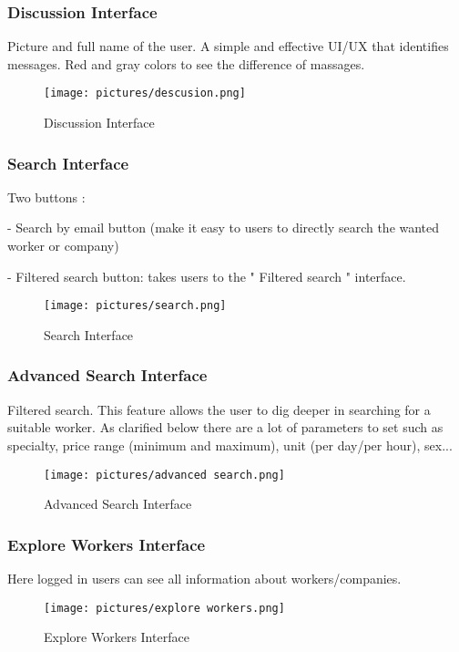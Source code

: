 \documentclass[12pt]{report}
\begin{document}
\subsubsection{Discussion Interface}
Picture and full name of the user.
A simple and effective UI/UX  that identifies  messages.
Red and gray colors to see the difference of massages.
\begin{figure}[!htbp]

        \centering
    \texttt{[image: pictures/descusion.png]}
    \caption{Discussion Interface}
    \label{fig:discussion_interface}
\end{figure}
\pagebreak
\subsubsection{Search Interface}
Two buttons : 

- Search by email button (make it easy to users to directly search the wanted worker or company)

- Filtered search button: takes users to the " Filtered search " interface.


\begin{figure}[!htbp]

        \centering
    \texttt{[image: pictures/search.png]}
    \caption{Search Interface}
    \label{fig:search}
\end{figure}
\pagebreak
\subsubsection{Advanced Search Interface}
Filtered search. This feature allows the user to dig deeper in searching for a suitable worker. As clarified below there are a lot of parameters to set such as specialty, price range (minimum and maximum), unit (per day/per hour),  sex...
\begin{figure}[!htbp]

        \centering
    \texttt{[image: pictures/advanced search.png]}
    \caption{Advanced Search Interface}
    \label{fig:advanced_search}
\end{figure}
\pagebreak
\subsubsection{Explore Workers Interface}
Here logged in users can see all information about workers/companies.
\begin{figure}[!htbp]

        \centering
    \texttt{[image: pictures/explore workers.png]}
    \caption{Explore Workers Interface}
    \label{fig:explore_workers}
\end{figure}
\pagebreak
\end{document}
